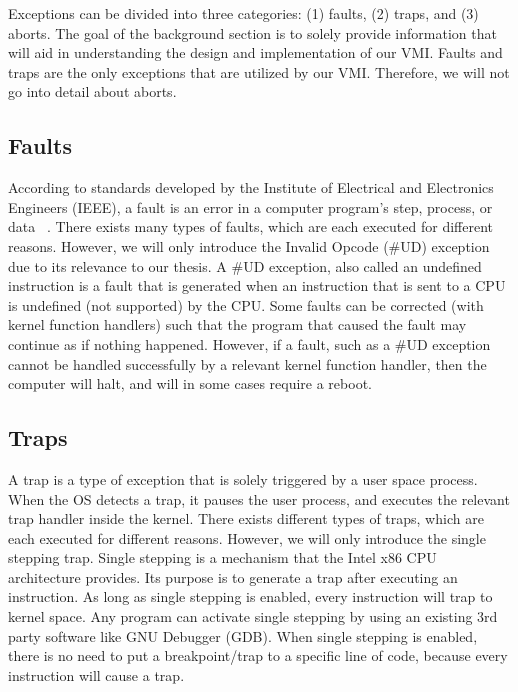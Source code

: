 \documentclass{report}
\begin{document}
\begin{spacing}{1.5}
{\large
Exceptions can be divided into three categories: (1) faults, (2) traps, and (3) aborts. The goal of the background section is to solely provide information that will aid in understanding the design and implementation of our VMI. Faults and traps are the only exceptions that are utilized by our VMI. Therefore, we will not go into detail about aborts.  
}

\subsection{Faults}
{\large
According to standards developed by the Institute of Electrical and Electronics Engineers (IEEE), a fault is an error in a computer program's step, process, or data ~\cite{diallo2017fault}. There exists many types of faults, which are each executed for different reasons. However, we will only introduce the Invalid Opcode (\#UD) exception due to its relevance to our thesis. A \#UD exception, also called an undefined instruction is a fault that is generated when an instruction that is sent to a CPU is undefined (not supported) by the CPU. Some faults can be corrected (with kernel function handlers) such that the program that caused the fault may continue as if nothing happened. However, if a fault, such as a \#UD exception cannot be handled successfully by a relevant kernel function handler, then the computer will halt, and will in some cases require a reboot.
}


\subsection{Traps}
{\large
A trap is a type of exception that is solely triggered by a user space process. When the OS detects a trap, it pauses the user process, and executes the relevant trap handler inside the kernel. There exists different types of traps, which are each executed for different reasons. However, we will only introduce the single stepping trap. Single stepping is a mechanism that the Intel x86 CPU architecture provides. Its purpose is to generate a trap after executing an instruction. As long as single stepping is enabled, every instruction will trap to kernel space. Any program can activate single stepping by using an existing 3rd party software like GNU Debugger (GDB). When single stepping is enabled, there is no need to put a breakpoint/trap to a specific line of code, because every instruction will cause a trap.
\newline
}



\end{spacing}
\end{document}
